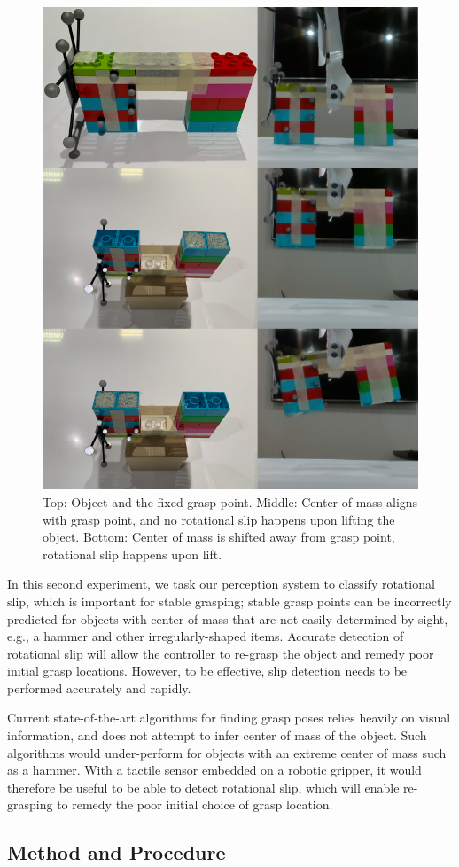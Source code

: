 \documentclass[fyp]{socreport}
\begin{document}
\begin{figure}
\centering
\includegraphics[width=0.55\columnwidth]{images/robotsetup/slip_graf.png}
\caption{Top: Object and the fixed grasp point. Middle: Center of mass aligns with grasp point, and no rotational slip happens upon lifting the object. Bottom: Center of mass is shifted away from grasp point, rotational slip happens upon lift. }
\label{img:slips}
\end{figure}

In this second experiment, we task our perception system to classify rotational
slip, which is important for stable grasping; stable grasp points can be
incorrectly predicted for objects with center-of-mass that are not easily
determined by sight, e.g., a hammer and other irregularly-shaped items. Accurate
detection of rotational slip will allow the controller to re-grasp the object
and remedy poor initial grasp locations. However, to be effective, slip
detection needs to be performed accurately and rapidly.

Current state-of-the-art algorithms for finding grasp poses relies heavily on
visual information, and does not attempt to infer center of mass of the object.
Such algorithms would under-perform for objects with an extreme center of mass
such as a hammer. With a tactile sensor embedded on a robotic gripper, it would
therefore be useful to be able to detect rotational slip, which will enable
re-grasping to remedy the poor initial choice of grasp location.

\subsection{Method and Procedure}
\end{document}
